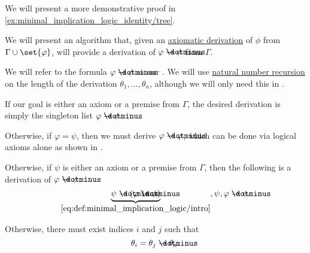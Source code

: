 \begin{comments}
  \item We will present a more demonstrative proof in \eqref{ex:minimal_implication_logic_identity/tree}.
\end{comments}

\begin{algorithm}\label{alg:derivation_conclusion_hypothesis_introduction}
  We will present an algorithm that, given an \hyperref[def:axiomatic_derivation]{axiomatic derivation} of \( \phi \) from \( \Gamma \cup \set{ \varphi } \), will provide a derivation of \( \varphi \synimplies \phi \) from \( \Gamma \).

  We will refer to the formula \( \varphi \synimplies \phi \) as our . We will use \hyperref[rem:natural_number_recursion]{natural number recursion} on the length of the derivation \( \theta_1, \ldots, \theta_n \), although we will only need this in .

  \begin{thmenum}
     If our goal is either an axiom or a premise from \( \Gamma \), the desired derivation is simply the singleton list \( \varphi \synimplies \phi \).

     Otherwise, if \( \varphi = \psi \), then we must derive \( \varphi \synimplies \varphi \), which can be done via logical axioms alone as shown in .

     Otherwise, if \( \psi \) is either an axiom or a premise from \( \Gamma \), then the following is a derivation of \( \varphi \synimplies \psi \):
    \begin{equation*}
      \underbrace{\psi \synimplies (\varphi \synimplies \psi)}_{\eqref{eq:def:minimal_implication_logic/intro}},
      \psi,
      \varphi \synimplies \psi.
    \end{equation*}

     Otherwise, there must exist indices \( i \) and \( j \) such that
    \begin{equation*}
      \theta_i = \theta_j \synimplies \theta_n.
    \end{equation*}


\end{thmenum}
\end{algorithm}
